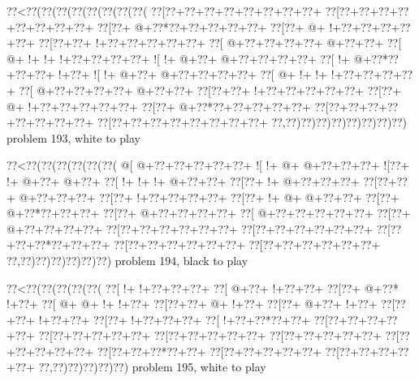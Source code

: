 \vbox{\vbox{\goo
\0??<\0??(\0??(\0??(\0??(\0??(\0??(\0??(\0??(
\0??[\0??+\0??+\0??+\0??+\0??+\0??+\0??+\0??+
\0??[\0??+\0??+\0??+\0??+\0??+\0??+\0??+\0??+
\0??[\0??+\- @+\0??*\0??+\0??+\0??+\0??+\0??+
\0??[\0??+\- @+\- !+\0??+\0??+\0??+\0??+\0??+
\0??[\0??+\0??+\- !+\0??+\0??+\0??+\0??+\0??+
\0??[\- @+\0??+\0??+\0??+\0??+\- @+\0??+\0??+
\0??[\- @+\- !+\- !+\- !+\0??+\0??+\0??+\0??+
\- ![\- !+\- @+\0??+\- @+\0??+\0??+\0??+\0??+
\0??[\- !+\- @+\0??*\0??+\0??+\0??+\- !+\0??+
\- ![\- !+\- @+\0??+\- @+\0??+\0??+\0??+\0??+
\0??[\- @+\- !+\- !+\- !+\0??+\0??+\0??+\0??+
\0??[\- @+\0??+\0??+\0??+\0??+\- @+\0??+\0??+
\0??[\0??+\0??+\- !+\0??+\0??+\0??+\0??+\0??+
\0??[\0??+\- @+\- !+\0??+\0??+\0??+\0??+\0??+
\0??[\0??+\- @+\0??*\0??+\0??+\0??+\0??+\0??+
\0??[\0??+\0??+\0??+\0??+\0??+\0??+\0??+\0??+
\0??[\0??+\0??+\0??+\0??+\0??+\0??+\0??+\0??+
\0??,\0??)\0??)\0??)\0??)\0??)\0??)\0??)\0??)
}
\hfil problem 193, white to play\hfil\break
}

\vbox{\vbox{\goo
\0??<\0??(\0??(\0??(\0??(\0??(\0??(
\- @[\- @+\0??+\0??+\0??+\0??+\0??+
\- ![\- !+\- @+\- @+\0??+\0??+\0??+
\- ![\0??+\- !+\- @+\0??+\- @+\0??+
\0??[\- !+\- !+\- !+\- @+\0??+\0??+
\0??[\0??+\- !+\- @+\0??+\0??+\0??+
\0??[\0??+\0??+\- @+\0??+\0??+\0??+
\0??[\0??+\- !+\0??+\0??+\0??+\0??+
\0??[\0??+\- !+\- @+\- @+\0??+\0??+
\0??[\0??+\- @+\0??*\0??+\0??+\0??+
\0??[\0??+\- @+\0??+\0??+\0??+\0??+
\0??[\- @+\0??+\0??+\0??+\0??+\0??+
\0??[\0??+\- @+\0??+\0??+\0??+\0??+
\0??[\0??+\0??+\0??+\0??+\0??+\0??+
\0??[\0??+\0??+\0??+\0??+\0??+\0??+
\0??[\0??+\0??+\0??*\0??+\0??+\0??+
\0??[\0??+\0??+\0??+\0??+\0??+\0??+
\0??[\0??+\0??+\0??+\0??+\0??+\0??+
\0??,\0??)\0??)\0??)\0??)\0??)\0??)
}
\hfil problem 194, black to play\hfil\break
}

\vbox{\vbox{\goo
\0??<\0??(\0??(\0??(\0??(\0??(
\0??[\- !+\- !+\0??+\0??+\0??+
\0??[\- @+\0??+\- !+\0??+\0??+
\0??[\0??+\- @+\0??*\- !+\0??+
\0??[\- @+\- @+\- !+\- !+\0??+
\0??[\0??+\0??+\- @+\- !+\0??+
\0??[\0??+\- @+\0??+\- !+\0??+
\0??[\0??+\0??+\- !+\0??+\0??+
\0??[\0??+\- !+\0??+\0??+\0??+
\0??[\- !+\0??+\0??*\0??+\0??+
\0??[\0??+\0??+\0??+\0??+\0??+
\0??[\0??+\0??+\0??+\0??+\0??+
\0??[\0??+\0??+\0??+\0??+\0??+
\0??[\0??+\0??+\0??+\0??+\0??+
\0??[\0??+\0??+\0??+\0??+\0??+
\0??[\0??+\0??+\0??*\0??+\0??+
\0??[\0??+\0??+\0??+\0??+\0??+
\0??[\0??+\0??+\0??+\0??+\0??+
\0??,\0??)\0??)\0??)\0??)\0??)
}
\hfil problem 195, white to play\hfil\break
}

